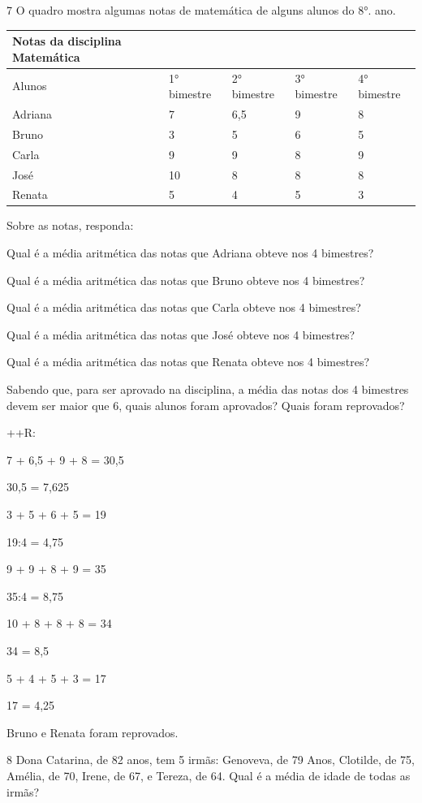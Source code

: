 \num{7} O quadro mostra algumas notas de matemática de alguns alunos do 8°.
ano.


\begin{longtable}[]{@{}lllll@{}}
\toprule
Notas da disciplina Matemática & & & &\tabularnewline
\midrule
\endhead
Alunos & 1° bimestre & 2° bimestre & 3° bimestre & 4°
bimestre\tabularnewline
Adriana & 7 & 6,5 & 9 & 8\tabularnewline
Bruno & 3 & 5 & 6 & 5\tabularnewline
Carla & 9 & 9 & 8 & 9\tabularnewline
José & 10 & 8 & 8 & 8\tabularnewline
Renata & 5 & 4 & 5 & 3\tabularnewline
\bottomrule
\end{longtable}

Sobre as notas, responda:
\item Qual é a média aritmética das notas que Adriana obteve nos 4
bimestres?
\item Qual é a média aritmética das notas que Bruno obteve nos 4 bimestres?
\item Qual é a média aritmética das notas que Carla obteve nos 4 bimestres?
\item Qual é a média aritmética das notas que José obteve nos 4 bimestres?
\item Qual é a média aritmética das notas que Renata obteve nos 4
bimestres?
\item Sabendo que, para ser aprovado na disciplina, a média das notas dos 4
bimestres devem ser maior que 6, quais alunos foram aprovados? Quais
foram reprovados?

++R:
\item

7 + 6,5 + 9 + 8 = 30,5

30,5  = 7,625
\item

3 + 5 + 6 + 5 = 19

19:4 = 4,75
\item 9 + 9 + 8 + 9 = 35

35:4 = 8,75
\item

10 + 8 + 8 + 8 = 34

34  = 8,5
\item

5 + 4 + 5 + 3 = 17

17  = 4,25
\item Bruno e Renata foram reprovados.

\num{8} Dona Catarina, de 82 anos, tem 5 irmãs: Genoveva, de 79 Anos,
Clotilde, de 75, Amélia, de 70, Irene, de 67, e Tereza, de 64. Qual é a
média de idade de todas as irmãs?

